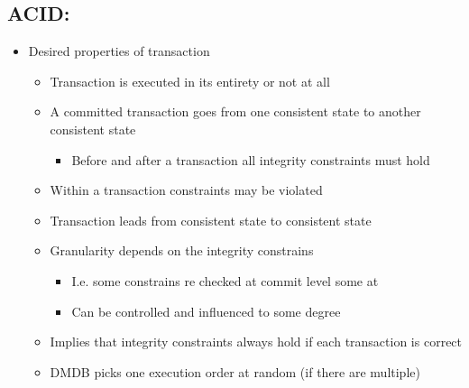 \subsection{ACID:}
\begin{itemize}
    \item Desired properties of transaction
        \begin{itemize}
            \item Transaction is executed in its entirety or not at all
        \end{itemize}
        \begin{itemize}
            \item A committed transaction goes from one consistent state to another consistent state
                \begin{itemize}
                    \item Before and after a transaction all integrity constraints must hold
                \end{itemize}
            \item Within a transaction constraints may be violated
            \item Transaction leads from consistent state to consistent state
            \item Granularity depends on the integrity constrains
                \begin{itemize}
                    \item I.e. some constrains re checked at commit level some at 
                    \item Can be controlled and influenced to some degree
                \end{itemize}
        \end{itemize}
        \begin{itemize}
             Transaction executes as if it were alone in the system
                \begin{itemize}
                    \item I.e. enforce serializability
                    \item Much to hard to enforce
                \end{itemize}
            \item Implies that integrity constraints always hold if each transaction is correct
            \item DMDB picks one execution order at random (if there are multiple)

\end{itemize}
\end{itemize}
